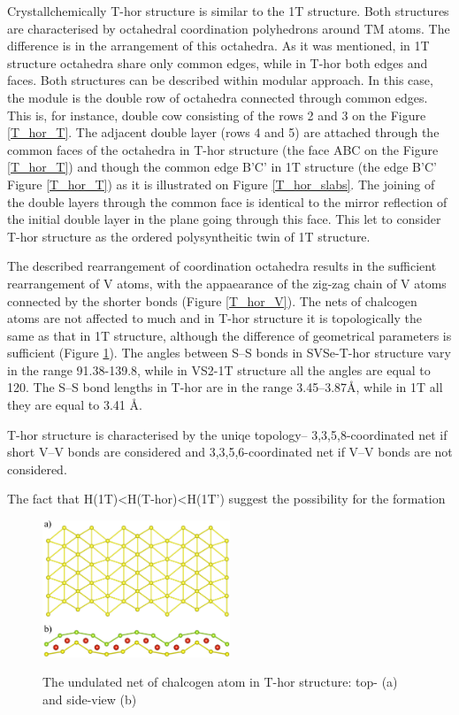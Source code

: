 \documentclass[a4paperm]{article}
\begin{document}
Crystallchemically T-hor structure is similar to the 1T structure.
Both structures are characterised by octahedral coordination polyhedrons around TM atoms.
The difference is in the arrangement of this octahedra.
As it was mentioned, in 1T structure octahedra share only common edges, while in T-hor both edges and faces.
Both structures can be described within modular approach.
In this case, the module is the double row of octahedra connected through common edges.
This is, for instance, double cow consisting of the rows 2 and 3 on the Figure \ref{T_hor_T}.
The adjacent double layer (rows 4 and 5) are attached through the common faces  of the octahedra in T-hor structure (the face ABC on the Figure \ref{T_hor_T}) and though the common edge B'C' in 1T structure (the edge B'C' Figure \ref{T_hor_T}) as it is illustrated on Figure \ref{T_hor_slabs}.
The joining of the double layers through the common face is identical to the mirror reflection of the initial double layer in the plane going through this face.
This let to consider T-hor structure as the ordered polysyntheitic twin of 1T structure.

The described rearrangement of coordination octahedra results in the sufficient rearrangement of V atoms, with the appaearance of the zig-zag chain of V atoms connected by the shorter bonds (Figure \ref{T_hor_V}).
The nets of chalcogen atoms are not affected to much and in T-hor structure it is topologically the same as that in 1T structure, although the difference of geometrical parameters is sufficient (Figure \ref{T_hor_hcb}).
The angles between S--S bonds in SVSe-T-hor structure vary in the range 91.38-139.8\textdegree, while in VS2-1T structure all the angles are equal to 120\textdegree.
The S--S bond lengths in T-hor are in the range 3.45--3.87\AA, while in 1T all they are equal to 3.41 \AA.

T-hor structure is characterised by the uniqe topology– 3,3,5,8-coordinated net if short V--V bonds are considered and 3,3,5,6-coordinated net if V--V bonds are not considered.

The fact that H(1T)<H(T-hor)<H(1T') suggest the possibility for the formation

\begin{figure}[H]
        \includegraphics[width=0.5\textwidth]{T_hor_hcb.png} \\
        \caption{The undulated net of chalcogen atom in T-hor structure: top- (a) and side-view (b)}
\label{T_hor_hcb}
\end{figure}
\end{document}
